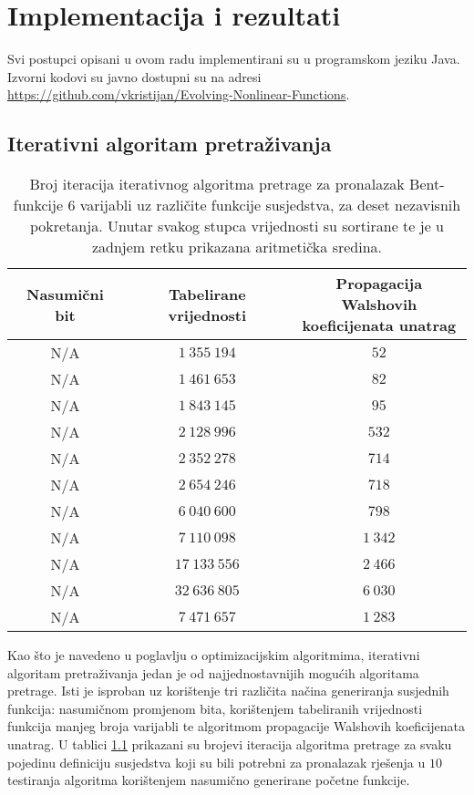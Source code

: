\chapter{Implementacija i rezultati}

Svi postupci opisani u ovom radu implementirani su u programskom jeziku Java.
Izvorni kodovi su javno dostupni su na adresi \href{https://github.com/vkristijan/Evolving-Nonlinear-Functions}{https://github.com/vkristijan/Evolving-Nonlinear-Functions}.

\section{Iterativni algoritam pretraživanja}
\begin{table}[]
    \centering
    \captionsetup{justification=centering}
    \caption{Broj iteracija iterativnog algoritma pretrage za pronalazak Bent-funkcije $6$ varijabli uz različite funkcije susjedstva, za deset nezavisnih pokretanja. Unutar svakog stupca vrijednosti su sortirane te je u zadnjem retku prikazana aritmetička sredina.}
    \begin{tabular}{ccc} \hline
        Nasumični bit & Tabelirane vrijednosti & \makecell{Propagacija Walshovih \\ koeficijenata unatrag} \\ \hline
        N/A &  $1\:355\:194$ &     $52$ \\
        N/A &  $1\:461\:653$ &     $82$ \\
        N/A &  $1\:843\:145$ &     $95$ \\
        N/A &  $2\:128\:996$ &    $532$ \\
        N/A &  $2\:352\:278$ &    $714$ \\
        N/A &  $2\:654\:246$ &    $718$ \\
        N/A &  $6\:040\:600$ &    $798$ \\
        N/A &  $7\:110\:098$ & $1\:342$ \\
        N/A & $17\:133\:556$ & $2\:466$ \\
        N/A & $32\:636\:805$ & $6\:030$ \\ \hline
        N/A &  $7\:471\:657$ & $1\:283$
    \end{tabular}
    \label{tbl:iterative_6}
\end{table}

Kao što je navedeno u poglavlju o optimizacijskim algoritmima, iterativni algoritam pretraživanja jedan je od najjednostavnijih mogućih algoritama pretrage. 
Isti je isproban uz korištenje tri različita načina generiranja susjednih funkcija: nasumičnom promjenom bita, korištenjem tabeliranih vrijednosti funkcija manjeg broja varijabli te algoritmom propagacije Walshovih koeficijenata unatrag.
U tablici \ref{tbl:iterative_6} prikazani su brojevi iteracija algoritma pretrage za svaku pojedinu definiciju susjedstva koji su bili potrebni za pronalazak rješenja u $10$ testiranja algoritma korištenjem nasumično generirane početne funkcije.

